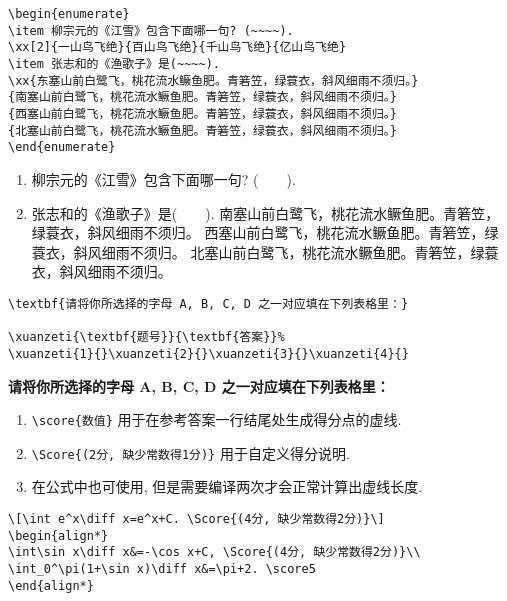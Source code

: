\documentclass{hfutexam}
\newcommand{\diff}{\,\mathrm{d}}
\begin{document}
\textit{\color{blue}{选择题示例:}}
\begin{lstlisting}
\begin{enumerate}
\item 柳宗元的《江雪》包含下面哪一句? (~~~~).
\xx[2]{一山鸟飞绝}{百山鸟飞绝}{千山鸟飞绝}{亿山鸟飞绝}
\item 张志和的《渔歌子》是(~~~~).
\xx{东塞山前白鹭飞，桃花流水鳜鱼肥。青箬笠，绿蓑衣，斜风细雨不须归。}
{南塞山前白鹭飞，桃花流水鳜鱼肥。青箬笠，绿蓑衣，斜风细雨不须归。}
{西塞山前白鹭飞，桃花流水鳜鱼肥。青箬笠，绿蓑衣，斜风细雨不须归。}
{北塞山前白鹭飞，桃花流水鳜鱼肥。青箬笠，绿蓑衣，斜风细雨不须归。}
\end{enumerate}
\end{lstlisting}

\begin{tcolorbox}
\begin{enumerate}
\item 柳宗元的《江雪》包含下面哪一句? (~~~~).
\item 张志和的《渔歌子》是(~~~~).
{南塞山前白鹭飞，桃花流水鳜鱼肥。青箬笠，绿蓑衣，斜风细雨不须归。}
{西塞山前白鹭飞，桃花流水鳜鱼肥。青箬笠，绿蓑衣，斜风细雨不须归。}
{北塞山前白鹭飞，桃花流水鳜鱼肥。青箬笠，绿蓑衣，斜风细雨不须归。}
\end{enumerate}
\end{tcolorbox}

\textit{\color{blue}{选择题示例:}}
\begin{lstlisting}
\textbf{请将你所选择的字母 A, B, C, D 之一对应填在下列表格里：}

\xuanzeti{\textbf{题号}}{\textbf{答案}}%
\xuanzeti{1}{}\xuanzeti{2}{}\xuanzeti{3}{}\xuanzeti{4}{}
\end{lstlisting}

\begin{tcolorbox}
\textbf{请将你所选择的字母 A, B, C, D 之一对应填在下列表格里：}

%
\end{tcolorbox}

\newpage
{}
\begin{enumerate}[resume]
\item \lstinline|\score{数值}| 用于在参考答案一行结尾处生成得分点的虚线.
\item \lstinline|\Score{(2分, 缺少常数得1分)}| 用于自定义得分说明.
\item 在公式中也可使用, 但是需要编译两次才会正常计算出虚线长度.
\end{enumerate}
\textit{\color{blue}{得分点示例:}}
\begin{lstlisting}
\[\int e^x\diff x=e^x+C. \Score{(4分, 缺少常数得2分)}\]
\begin{align*}
\int\sin x\diff x&=-\cos x+C, \Score{(4分, 缺少常数得2分)}\\
\int_0^\pi(1+\sin x)\diff x&=\pi+2. \score5
\end{align*}
\end{lstlisting}
\end{document}
